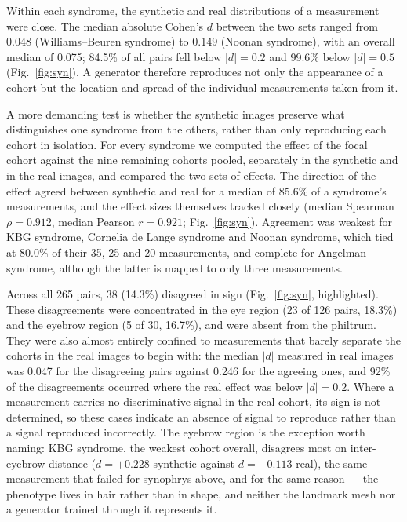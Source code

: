\documentclass[11pt]{article}
\begin{document}
Within each syndrome, the synthetic and real distributions of a measurement were
close. The median absolute Cohen's $d$ between the two sets ranged from 0.048
(Williams--Beuren syndrome) to 0.149 (Noonan syndrome), with an overall
median of 0.075; 84.5\% of all pairs fell below $|d| = 0.2$ and 99.6\% below
$|d| = 0.5$ (Fig.~\ref{fig:syn}). A generator therefore reproduces not only the appearance of a
cohort but the location and spread of the individual measurements taken from it.

A more demanding test is whether the synthetic images preserve what
distinguishes one syndrome from the others, rather than only reproducing each
cohort in isolation. For every syndrome we computed the effect of the focal
cohort against the nine remaining cohorts pooled, separately in the synthetic
and in the real images, and compared the two sets of effects. The direction of
the effect agreed between synthetic and real for a median of 85.6\% of a
syndrome's measurements, and the effect sizes themselves tracked closely
(median Spearman $\rho = 0.912$, median Pearson $r = 0.921$;
Fig.~\ref{fig:syn}). Agreement was
weakest for KBG syndrome, Cornelia de Lange syndrome and Noonan syndrome, which
tied at 80.0\% of their 35, 25 and 20 measurements, and complete for Angelman
syndrome, although the latter is mapped to only three measurements.

Across all 265 pairs, 38 (14.3\%) disagreed in sign
(Fig.~\ref{fig:syn}, highlighted). These disagreements were
concentrated in the eye region (23 of 126 pairs, 18.3\%) and the eyebrow region
(5 of 30, 16.7\%), and were absent from the philtrum. They were
also almost entirely confined to measurements that barely separate the cohorts
in the real images to begin with: the median $|d|$ measured in real images was
0.047 for the disagreeing pairs against 0.246 for the agreeing ones, and 92\% of
the disagreements occurred where the real effect was below $|d| = 0.2$. Where a
measurement carries no discriminative signal in the real cohort, its sign is not
determined, so these cases indicate an absence of signal to reproduce rather
than a signal reproduced incorrectly. The eyebrow region is the exception worth
naming: KBG syndrome, the weakest cohort overall, disagrees most on inter-eyebrow
distance ($d = +0.228$ synthetic against $d = -0.113$ real), the same measurement
that failed for synophrys above, and for the same reason --- the phenotype lives
in hair rather than in shape, and neither the landmark mesh nor a generator
trained through it represents it.
\end{document}
